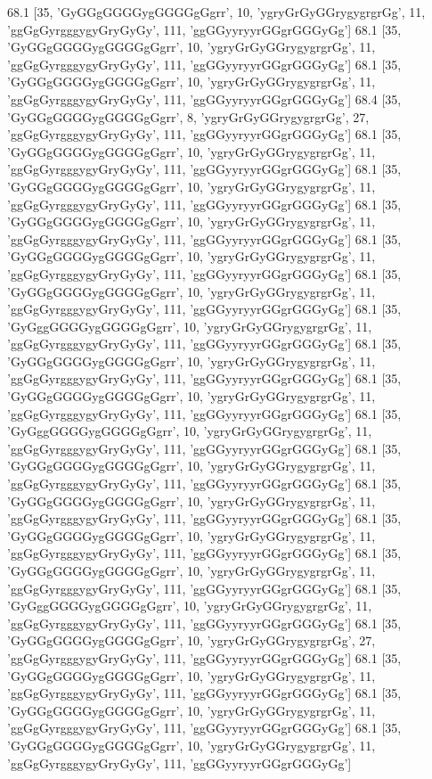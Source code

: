 68.1 [35, 'GyGGgGGGGygGGGGgGgrr', 10, 'ygryGrGyGGrygygrgrGg', 11, 'ggGgGyrgggygyGryGyGy', 111, 'ggGGyyryyrGGgrGGGyGg']
68.1 [35, 'GyGGgGGGGygGGGGgGgrr', 10, 'ygryGrGyGGrygygrgrGg', 11, 'ggGgGyrgggygyGryGyGy', 111, 'ggGGyyryyrGGgrGGGyGg']
68.1 [35, 'GyGGgGGGGygGGGGgGgrr', 10, 'ygryGrGyGGrygygrgrGg', 11, 'ggGgGyrgggygyGryGyGy', 111, 'ggGGyyryyrGGgrGGGyGg']
68.4 [35, 'GyGGgGGGGygGGGGgGgrr', 8, 'ygryGrGyGGrygygrgrGg', 27, 'ggGgGyrgggygyGryGyGy', 111, 'ggGGyyryyrGGgrGGGyGg']
68.1 [35, 'GyGGgGGGGygGGGGgGgrr', 10, 'ygryGrGyGGrygygrgrGg', 11, 'ggGgGyrgggygyGryGyGy', 111, 'ggGGyyryyrGGgrGGGyGg']
68.1 [35, 'GyGGgGGGGygGGGGgGgrr', 10, 'ygryGrGyGGrygygrgrGg', 11, 'ggGgGyrgggygyGryGyGy', 111, 'ggGGyyryyrGGgrGGGyGg']
68.1 [35, 'GyGGgGGGGygGGGGgGgrr', 10, 'ygryGrGyGGrygygrgrGg', 11, 'ggGgGyrgggygyGryGyGy', 111, 'ggGGyyryyrGGgrGGGyGg']
68.1 [35, 'GyGGgGGGGygGGGGgGgrr', 10, 'ygryGrGyGGrygygrgrGg', 11, 'ggGgGyrgggygyGryGyGy', 111, 'ggGGyyryyrGGgrGGGyGg']
68.1 [35, 'GyGGgGGGGygGGGGgGgrr', 10, 'ygryGrGyGGrygygrgrGg', 11, 'ggGgGyrgggygyGryGyGy', 111, 'ggGGyyryyrGGgrGGGyGg']
68.1 [35, 'GyGggGGGGygGGGGgGgrr', 10, 'ygryGrGyGGrygygrgrGg', 11, 'ggGgGyrgggygyGryGyGy', 111, 'ggGGyyryyrGGgrGGGyGg']
68.1 [35, 'GyGGgGGGGygGGGGgGgrr', 10, 'ygryGrGyGGrygygrgrGg', 11, 'ggGgGyrgggygyGryGyGy', 111, 'ggGGyyryyrGGgrGGGyGg']
68.1 [35, 'GyGGgGGGGygGGGGgGgrr', 10, 'ygryGrGyGGrygygrgrGg', 11, 'ggGgGyrgggygyGryGyGy', 111, 'ggGGyyryyrGGgrGGGyGg']
68.1 [35, 'GyGggGGGGygGGGGgGgrr', 10, 'ygryGrGyGGrygygrgrGg', 11, 'ggGgGyrgggygyGryGyGy', 111, 'ggGGyyryyrGGgrGGGyGg']
68.1 [35, 'GyGGgGGGGygGGGGgGgrr', 10, 'ygryGrGyGGrygygrgrGg', 11, 'ggGgGyrgggygyGryGyGy', 111, 'ggGGyyryyrGGgrGGGyGg']
68.1 [35, 'GyGGgGGGGygGGGGgGgrr', 10, 'ygryGrGyGGrygygrgrGg', 11, 'ggGgGyrgggygyGryGyGy', 111, 'ggGGyyryyrGGgrGGGyGg']
68.1 [35, 'GyGGgGGGGygGGGGgGgrr', 10, 'ygryGrGyGGrygygrgrGg', 11, 'ggGgGyrgggygyGryGyGy', 111, 'ggGGyyryyrGGgrGGGyGg']
68.1 [35, 'GyGGgGGGGygGGGGgGgrr', 10, 'ygryGrGyGGrygygrgrGg', 11, 'ggGgGyrgggygyGryGyGy', 111, 'ggGGyyryyrGGgrGGGyGg']
68.1 [35, 'GyGggGGGGygGGGGgGgrr', 10, 'ygryGrGyGGrygygrgrGg', 11, 'ggGgGyrgggygyGryGyGy', 111, 'ggGGyyryyrGGgrGGGyGg']
68.1 [35, 'GyGGgGGGGygGGGGgGgrr', 10, 'ygryGrGyGGrygygrgrGg', 27, 'ggGgGyrgggygyGryGyGy', 111, 'ggGGyyryyrGGgrGGGyGg']
68.1 [35, 'GyGGgGGGGygGGGGgGgrr', 10, 'ygryGrGyGGrygygrgrGg', 11, 'ggGgGyrgggygyGryGyGy', 111, 'ggGGyyryyrGGgrGGGyGg']
68.1 [35, 'GyGGgGGGGygGGGGgGgrr', 10, 'ygryGrGyGGrygygrgrGg', 11, 'ggGgGyrgggygyGryGyGy', 111, 'ggGGyyryyrGGgrGGGyGg']
68.1 [35, 'GyGGgGGGGygGGGGgGgrr', 10, 'ygryGrGyGGrygygrgrGg', 11, 'ggGgGyrgggygyGryGyGy', 111, 'ggGGyyryyrGGgrGGGyGg']
